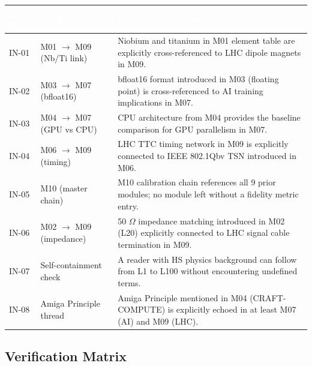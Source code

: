 \documentclass[11pt,letterpaper]{article}
\newcommand{\tableheader}[1]{\textbf{\sffamily\textcolor{white}{#1}}}
\begin{document}
\begin{center}
\begin{tabularx}{\textwidth}{C{1.5cm}L{3.8cm}X}
\toprule
{}
\tableheader{Test ID} & \tableheader{Verifies} & \tableheader{Expected Outcome} \\
\midrule
IN-01 & M01 $\rightarrow$ M09 (Nb/Ti link) & Niobium and titanium in M01 element table are explicitly cross-referenced to LHC dipole magnets in M09. \\
IN-02 & M03 $\rightarrow$ M07 (bfloat16) & bfloat16 format introduced in M03 (floating point) is cross-referenced to AI training implications in M07. \\
IN-03 & M04 $\rightarrow$ M07 (GPU vs CPU) & CPU architecture from M04 provides the baseline comparison for GPU parallelism in M07. \\
IN-04 & M06 $\rightarrow$ M09 (timing) & LHC TTC timing network in M09 is explicitly connected to IEEE 802.1Qbv TSN introduced in M06. \\
IN-05 & M10 (master chain) & M10 calibration chain references all 9 prior modules; no module left without a fidelity metric entry. \\
IN-06 & M02 $\rightarrow$ M09 (impedance) & 50 $\Omega$ impedance matching introduced in M02 (L20) explicitly connected to LHC signal cable termination in M09. \\
IN-07 & Self-containment check & A reader with HS physics background can follow from L1 to L100 without encountering undefined terms. \\
IN-08 & Amiga Principle thread & Amiga Principle mentioned in M04 (CRAFT-COMPUTE) is explicitly echoed in at least M07 (AI) and M09 (LHC). \\
\bottomrule
\end{tabularx}
\end{center}

\subsection{Verification Matrix}
\end{document}
